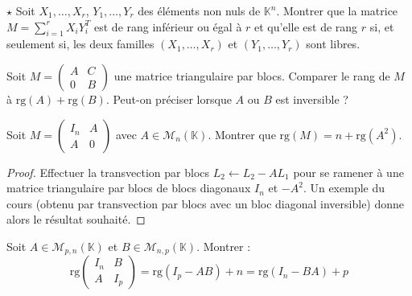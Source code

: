 \documentclass[french,a4paper]{article}
\newcommand{\K}{\mathbb{K}}
\theoremstyle{plain}
\theoremstyle{definition}
\theoremstyle{remark}
\begin{document}
\begin{ex}{$\star$}
	Soit $X_1,\ldots,X_r$, $Y_1,\ldots,Y_r$ des éléments non nuls de $\K^n$. Montrer que la matrice $M=\displaystyle\sum_{i=1}^{r}X_iY_i^T$ est de rang inférieur ou égal à $r$ et qu'elle est de rang $r$ si, et seulement si, les deux familles $(X_1,\ldots,X_r)$ et $(Y_1,\ldots,Y_r)$ sont libres.
\end{ex}

\begin{ex}{}
	Soit $M=\displaystyle\begin{pmatrix}
		A&C\\
		0&B
	\end{pmatrix}$ une matrice triangulaire par blocs. Comparer le rang de $M$ à $\text{rg}(A)+\text{rg}(B)$. Peut-on préciser lorsque $A$ ou $B$ est inversible ?
\end{ex}

\begin{ex}{}
		Soit $M=\displaystyle\begin{pmatrix}
		I_n&A\\
		A&0
	\end{pmatrix}$ avec $A\in\mathcal{M}_n(\K)$. Montrer que $\text{rg}(M)=n+\text{rg}(A^2)$.
\end{ex}
\begin{proof}
	Effectuer la transvection par blocs $L_2\leftarrow L_2-AL_1$ pour se ramener à une matrice triangulaire par blocs de blocs diagonaux $I_n$ et $-A^2$. Un exemple du cours (obtenu par transvection par blocs avec un bloc diagonal inversible) donne alors le résultat souhaité.
\end{proof}

\begin{ex}{}
	Soit $A\in\mathcal{M}_{p,n}(\K)$ et $B\in\mathcal{M}_{n,p}(\K)$. Montrer : $$\text{rg}\begin{pmatrix}
		I_n&B\\
		A&I_p
	\end{pmatrix}=\text{rg}(I_p-AB)+n=\text{rg}(I_n-BA)+p$$
\end{ex}
\end{document}
